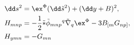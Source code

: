 \begin{equation}
\begin{aligned}
   \dd s^2 &= \ex^{\Phi}(\dd\tilde s^2)+(\dd y+B)^2 , \\
   H_{mnp} &= -\frac{1}{2}\tilde * \tilde \phi_{mnp}{}^q
      \tilde{\nabla}_q \ex^{\Phi}-3B_{[m}G_{np]} , \\
   H_{ymn} &= -G_{mn}
\end{aligned}
\end{equation}

